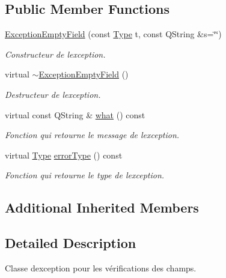 \subsection*{Public Member Functions}
\begin{DoxyCompactItemize}
\item 
\hyperlink{class_exception_empty_field_a66b400511c314e7bc5862fb86a879213}{Exception\+Empty\+Field} (const \hyperlink{class_exception_empty_field_af667c68aa2b6c49ad147004ce9a09584}{Type} t, const Q\+String \&s=\char`\"{}\char`\"{})
\begin{DoxyCompactList}\small\item\em Constructeur de l\textquotesingle{}exception. \end{DoxyCompactList}\item 
virtual \hyperlink{class_exception_empty_field_a47772f022b36af5b311e00f08cf2a58f}{$\sim$\+Exception\+Empty\+Field} ()\hypertarget{class_exception_empty_field_a47772f022b36af5b311e00f08cf2a58f}{}\label{class_exception_empty_field_a47772f022b36af5b311e00f08cf2a58f}

\begin{DoxyCompactList}\small\item\em Destructeur de l\textquotesingle{}exception. \end{DoxyCompactList}\item 
virtual const Q\+String \& \hyperlink{class_exception_empty_field_ac4d0d967d2651c5f79f9b94e8bd33be1}{what} () const 
\begin{DoxyCompactList}\small\item\em Fonction qui retourne le message de l\textquotesingle{}exception. \end{DoxyCompactList}\item 
virtual \hyperlink{class_exception_empty_field_af667c68aa2b6c49ad147004ce9a09584}{Type} \hyperlink{class_exception_empty_field_a4bb70e06dcd2a8631740245b58b5f6ec}{error\+Type} () const 
\begin{DoxyCompactList}\small\item\em Fonction qui retourne le type de l\textquotesingle{}exception. \end{DoxyCompactList}\end{DoxyCompactItemize}
\subsection*{Additional Inherited Members}


\subsection{Detailed Description}
Classe d\textquotesingle{}exception pour les vérifications des champs. 

